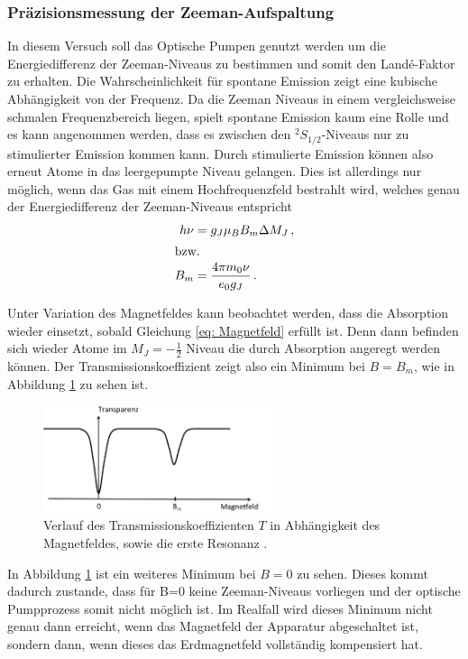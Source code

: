 \subsubsection*{Präzisionsmessung der Zeeman-Aufspaltung}
In diesem Versuch soll das Optische Pumpen genutzt werden um die Energiedifferenz der Zeeman-Niveaus zu bestimmen und somit den Landé-Faktor zu erhalten.
Die Wahrscheinlichkeit für spontane Emission zeigt eine kubische Abhängigkeit von der Frequenz.
Da die Zeeman Niveaus in einem vergleichsweise schmalen Frequenzbereich liegen, spielt spontane Emission kaum eine Rolle und es kann angenommen werden, dass es zwischen den $^2S_{1/2}$-Niveaus nur zu stimulierter Emission kommen kann.
Durch stimulierte Emission können also erneut Atome in das leergepumpte Niveau gelangen. 
Dies ist allerdings nur möglich, wenn das Gas mit einem Hochfrequenzfeld bestrahlt wird, welches genau der Energiedifferenz der Zeeman-Niveaus entspricht
\begin{align}\label{eq: Magnetfeld}
    h\nu &= g_J \mu_B B_m \Delta M_J \, , \\
\intertext{bzw.}
    B_m &= \frac{4 \pi m_0 \nu}{e_0 g_J} \, .
\end{align}

Unter Variation des Magnetfeldes kann beobachtet werden, dass die Absorption wieder einsetzt, sobald Gleichung \eqref{eq: Magnetfeld} erfüllt ist.
Denn dann befinden sich wieder Atome im $M_J= -\frac{1}{2}$ Niveau die durch Absorption angeregt werden können.
Der Transmissionskoeffizient zeigt also ein Minimum bei $B=B_m$, wie in Abbildung \ref{fig:tfig6} zu sehen ist.
\FloatBarrier
\begin{figure}[h]
    \centering
    \includegraphics[width=0.6\textwidth]{transmission2.png}
    \caption{Verlauf des Transmissionskoeffizienten $T$ in Abhängigkeit des Magnetfeldes, sowie die erste Resonanz \cite{quelle01}.}
    \label{fig:tfig6}
\end{figure}
\FloatBarrier
\noindent

In Abbildung \ref{fig:tfig6} ist ein weiteres Minimum bei $B=0$ zu sehen.
Dieses kommt dadurch zustande, dass für B=0 keine Zeeman-Niveaus vorliegen und der optische Pumpprozess somit nicht möglich ist.
Im Realfall wird dieses Minimum nicht genau dann erreicht, wenn das Magnetfeld der Apparatur abgeschaltet ist, sondern dann, wenn dieses das Erdmagnetfeld vollständig kompensiert hat.


